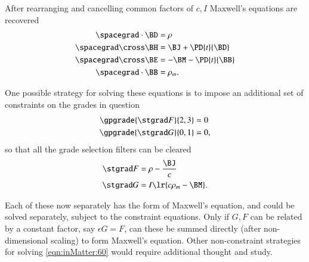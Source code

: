 After rearranging and cancelling common factors of \( c, I \) Maxwell's equations are recovered
\begin{dmath}\label{eqn:inMatter:180}
\begin{aligned}
\spacegrad \cdot \BD &= \rho \\
\spacegrad \cross \BH &= \BJ + \PD{t}{\BD}  \\
\spacegrad \cross \BE &= -\BM - \PD{t}{\BB} \\
\spacegrad \cdot \BB &= \rho_m.
\end{aligned}
\end{dmath}

One possible strategy for solving these equations is to impose an additional set of constraints on the grades in question
\begin{dmath}\label{eqn:inMatter:200}
\begin{aligned}
\gpgrade{ \stgrad F }{2,3} &= 0 \\
\gpgrade{ \stgrad G }{0,1} &= 0,
\end{aligned}
\end{dmath}
so that all the grade selection filters can be cleared
\begin{dmath}\label{eqn:inMatter:220}
\begin{aligned}
\stgrad F &= \rho - \frac{\BJ}{c} \\
\stgrad G &= I \lr{ c \rho_m - \BM }.
\end{aligned}
\end{dmath}

Each of these now separately has the form of Maxwell's equation, and could be solved separately, subject to the constraint equations.
Only if \( G, F \) can be related by a constant factor, say \( \epsilon G = F \), can these be summed directly (after non-dimensional scaling) to form Maxwell's equation.
Other non-constraint strategies for solving \cref{eqn:inMatter:60} would require additional thought and study.

